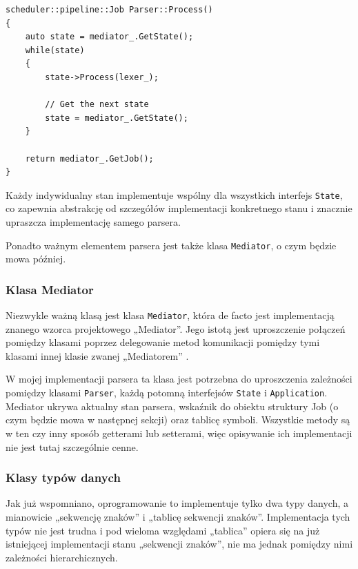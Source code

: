 \begin{lstlisting}[label=list:parser,caption=Metoda Parser::Process(),basicstyle=\footnotesize\ttfamily]
scheduler::pipeline::Job Parser::Process()
{
    auto state = mediator_.GetState();
    while(state)
    {
        state->Process(lexer_);
    
        // Get the next state
        state = mediator_.GetState();
    }
    
    return mediator_.GetJob();
}
\end{lstlisting}

Każdy indywidualny stan implementuje wspólny dla wszystkich interfejs \texttt{State}, co zapewnia abstrakcję od szczegółów implementacji konkretnego stanu i znacznie upraszcza implementację samego parsera.

Ponadto ważnym elementem parsera jest także klasa \texttt{Mediator}, o czym będzie mowa później.

\subsubsection{Klasa Mediator}

Niezwykle ważną klasą jest klasa \texttt{Mediator}, która de facto jest implementacją znanego wzorca projektowego „Mediator”. Jego istotą jest uproszczenie połączeń pomiędzy klasami poprzez delegowanie metod komunikacji pomiędzy tymi klasami innej klasie zwanej „Mediatorem” \cite{mediator}.

W mojej implementacji parsera ta klasa jest potrzebna do uproszczenia zależności pomiędzy klasami \texttt{Parser}, każdą potomną interfejsów \texttt{State} i \texttt{Application}. Mediator ukrywa aktualny stan parsera, wskaźnik do obiektu struktury Job (o czym będzie mowa w następnej sekcji) oraz tablicę symboli. Wszystkie metody są w ten czy inny sposób getterami lub setterami, więc opisywanie ich implementacji nie jest tutaj szczególnie cenne.

\subsubsection{Klasy typów danych}

Jak już wspomniano, oprogramowanie to implementuje tylko dwa typy danych, a mianowicie „sekwencję znaków” i „tablicę sekwencji znaków”. Implementacja tych typów nie jest trudna i pod wieloma względami „tablica” opiera się na już istniejącej implementacji stanu „sekwencji znaków”, nie ma jednak pomiędzy nimi zależności hierarchicznych.

